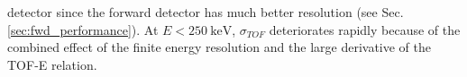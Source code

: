 \documentclass[number,5p]{elsarticle}
\begin{document}
detector since the forward detector has much better resolution (see Sec. \ref{sec:fwd_performance}).
At $E < \SI{250}{\keV}$, $\sigma_{TOF}$ deteriorates rapidly because of the
combined effect of the finite energy resolution and the large derivative of the TOF-E relation.
\end{document}
